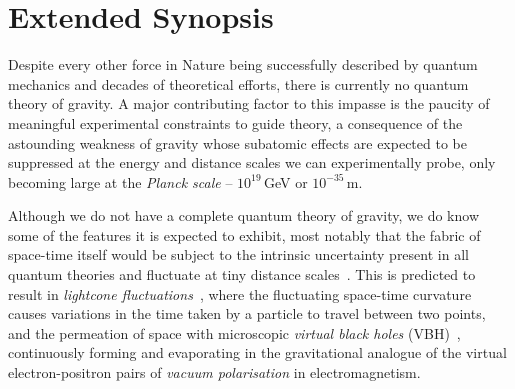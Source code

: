 \documentclass[a4paper,11pt]{article}
\begin{document}
\newpage



\section{Extended Synopsis}
\vspace{0.1 cm}


Despite every other force in Nature being successfully described by quantum mechanics and decades of theoretical efforts, there is currently no quantum theory of gravity. A major contributing factor to this impasse is the paucity of meaningful experimental constraints to guide theory, a consequence of the astounding weakness of gravity whose subatomic effects are expected to be suppressed at the energy and distance scales we can experimentally probe, only becoming large at the \textit{Planck scale} -- $10^{19}$\,GeV or $10^{-35}$\,m.

Although we do not have a complete quantum theory of gravity, we do know some of the features it is expected to exhibit, most notably that the fabric of space-time itself would be subject to the intrinsic uncertainty present in all quantum theories and fluctuate at tiny distance scales~\cite{PhysRev.97.511, Hawking}. This is predicted to result in \textit{lightcone fluctuations}~\cite{PauliLightcone, Ford1999, gr-qc/9909085}, where the fluctuating space-time curvature causes variations in the time taken by a particle to travel between two points, and the permeation of space with microscopic \textit{virtual black holes} (VBH)~\cite{Hawking1982,PhysRevD.53.3099}, continuously forming and evaporating in the gravitational analogue of the virtual electron-positron pairs of \textit{vacuum polarisation} in electromagnetism. 
\end{document}
